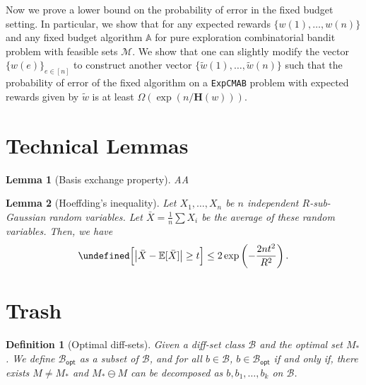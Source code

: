 \documentclass{article}
\newtheorem{define}{Definition}
\newtheorem{lemma}{Lemma}
\newcommand{\Problem}{\texttt{ExpCMAB}\xspace}
\newcommand{\M}{\mathcal M}
\newcommand{\B}{\mathcal B}
\newcommand{\Bopt}{\mathcal B_{\mathsf{opt}}}
\let\Pr\undefined
\DeclareMathOperator{\Pr}{Pr}
\begin{document}
\begin{spacing}{1.1}
Now we prove a lower bound on the probability of error in the fixed budget setting.
In particular, we show that for any expected rewards $\{w(1),\ldots, w(n)\}$ and any fixed budget algorithm $\mathbb A$ for pure exploration combinatorial bandit problem with feasible sets $\M$. 
We show that one can slightly modify the vector $\{w(e)\}_{e\in [n]}$ to construct another vector $\{\tilde w(1),\ldots,\tilde w(n)\}$ such that the probability of error of the fixed algorithm on a \Problem problem with expected rewards given by $\tilde w$ is at least $\Omega(\exp(n/\mathbf H(w)))$.



\section{Technical Lemmas}

\label{section:technical}

\begin{lemma}[Basis exchange property]
AA
\label{lemma:basis-exchange-matroid}
\end{lemma}

\begin{lemma}[Hoeffding's inequality]
\label{lemma:hoeffeding}
Let $X_1,\ldots, X_n$ be $n$ independent $R$-sub-Gaussian random variables. 
Let $\bar X=\frac{1}{n}\sum X_i$ be the average of these random variables.
Then, we have
$$
\Pr\Big[ \big|\bar X - \mathbb E[\bar X] \big| \ge t \Big] \le 
2\exp\left(-\frac{2nt^2}{R^2}\right).
$$
\end{lemma}

\section{Trash}




\begin{define}[Optimal diff-sets]
Given a diff-set class $\B$ and the optimal set $M_*$.
We define $\Bopt$ as a subset of $\B$, and for all $b\in \B$, $b\in \Bopt$ if and only if,
there exists $M\not=M_*$ and $M_* \ominus M$ can be decomposed as $b,b_1,\ldots,b_k$ on $\B$.
\end{define}


\end{spacing}
\end{document}

